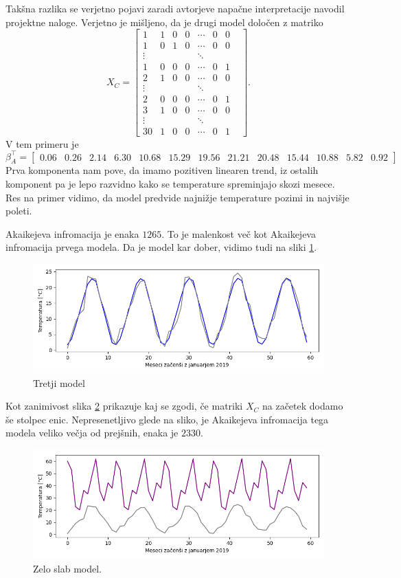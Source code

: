 \documentclass[12pt, a4paper]{article}
\begin{document}
Takšna razlika se verjetno pojavi zaradi avtorjeve napačne interpretacije navodil 
projektne naloge. Verjetno je mišljeno, da je drugi model določen z matriko
\[
    X_C = \begin{bmatrix}
        1 & 1 & 0 & 0 & \cdots & 0 & 0 \\
        1 & 0 & 1 & 0 & \cdots & 0 & 0 \\
        \vdots & & & & \ddots & & & \\
        1 & 0 & 0 & 0 & \cdots & 0 & 1 \\
        2 & 1 & 0 & 0 & \cdots & 0 & 0 \\
        \vdots & & & & \ddots & & & \\
        2 & 0 & 0 & 0 & \cdots & 0 & 1 \\
        3 & 1 & 0 & 0 & \cdots & 0 & 0 \\
        \vdots & & & & \ddots & & & \\
        30 & 1 & 0 & 0 & \cdots & 0 & 1 
    \end{bmatrix}.
\]
V tem primeru je
\footnotesize
\[
    \beta_A^\top = \begin{bmatrix}
        0.06 & 0.26 & 2.14 & 6.30 & 10.68 & 15.29 & 
        19.56 & 21.21 & 20.48 & 15.44 & 10.88 & 5.82 & 0.92
    \end{bmatrix}
\]
\normalsize
Prva komponenta nam pove, da imamo pozitiven linearen trend, 
iz ostalih komponent pa je lepo razvidno kako se temperature
spreminjajo skozi mesece. Res na primer vidimo, da model 
predvide najnižje temperature pozimi in najvišje poleti.

Akaikejeva infromacija je enaka $1265$. To je malenkost
več kot Akaikejeva infromacija prvega modela. Da je model 
kar dober, vidimo tudi na sliki \ref{png:tretji}.
\begin{figure}[H]
    \centering
    \includegraphics[width=14cm]{Slike/tretji_model.png}
    \caption{Tretji model}
    \label{png:tretji}
\end{figure}
Kot zanimivost slika \ref{png:cetrti} prikazuje kaj se zgodi, 
če matriki $X_C$ na začetek dodamo še stolpec enic.
Nepresenetljivo glede na sliko, je Akaikejeva infromacija tega modela veliko 
večja od prejšnih, enaka je $2330$.

\begin{figure}[H]
    \centering
    \includegraphics[width=14cm]{Slike/cetrti_model.png}
    \caption{Zelo slab model.}
    \label{png:cetrti}
\end{figure}
\end{document}

